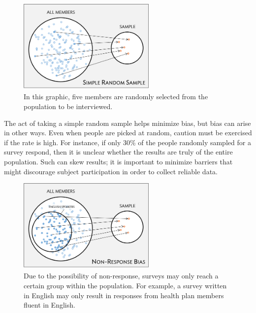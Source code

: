 
\begin{figure}[ht]
	\centering
	\includegraphics[width=0.60\textwidth]{ch_intro_to_data_oi_biostat/figures/sampleHealthPlan/sampleRandomHealthPlan.png}
	\caption{In this graphic, five members are randomly selected from the population to be interviewed.}
	\label{sampleRandomHealthPlan}
\end{figure}

The act of taking a simple random sample helps minimize bias, but bias can arise in other ways. Even when people are picked at random, caution must be exercised if the  rate  is high. For instance, if only 30\% of the people randomly sampled for a survey respond, then it is unclear whether the results are truly  of the entire population. Such   can skew results; it is important to minimize barriers that might discourage subject participation in order to collect reliable data.

\begin{figure}[h!]
	\centering
	{\includegraphics[width=0.60\textwidth]{ch_intro_to_data_oi_biostat/figures/sampleHealthPlan/sampleNonResponseHealthPlan.png}
	\caption{Due to the possibility of non-response, surveys may only reach a certain group within the population. For example, a survey written in English may only result in responses from health plan members fluent in English.}}
	\label{sampleNonResponseHealthPlan}
\end{figure}

